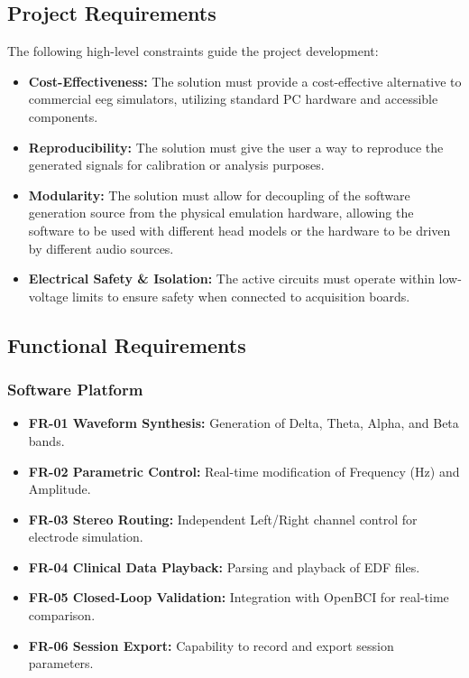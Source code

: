 \documentclass[../00_Main.tex]{subfiles}
\begin{document}
\subsection{Project Requirements}\label{subsec:project_reqs}
The following high-level constraints guide the project development:
\begin{itemize}
    \item \textbf{Cost-Effectiveness:} The solution must provide a cost-effective alternative to commercial \gls{eeg} simulators, utilizing standard PC hardware and accessible components.
    \item \textbf{Reproducibility:} The solution must give the user a way to reproduce the generated signals for calibration or analysis purposes.
    \item \textbf{Modularity:} The solution must allow for decoupling of the software generation source from the physical emulation hardware, allowing the software to be used with different head models or the hardware to be driven by different audio sources.
    \item \textbf{Electrical Safety \& Isolation:} The active circuits must operate within low-voltage limits to ensure safety when connected to acquisition boards.
\end{itemize}

\subsection{Functional Requirements}\label{subsec:func_reqs}

\subsubsection{Software Platform}
\begin{itemize}
    \item \textbf{FR-01 Waveform Synthesis:} Generation of Delta, Theta, Alpha, and Beta bands.
    \item \textbf{FR-02 Parametric Control:} Real-time modification of Frequency (Hz) and Amplitude.
    \item \textbf{FR-03 Stereo Routing:} Independent Left/Right channel control for electrode simulation.
    \item \textbf{FR-04 Clinical Data Playback:} Parsing and playback of EDF files.
    \item \textbf{FR-05 Closed-Loop Validation:} Integration with OpenBCI for real-time comparison.
    \item \textbf{FR-06 Session Export:} Capability to record and export session parameters.
\end{itemize}
\end{document}
